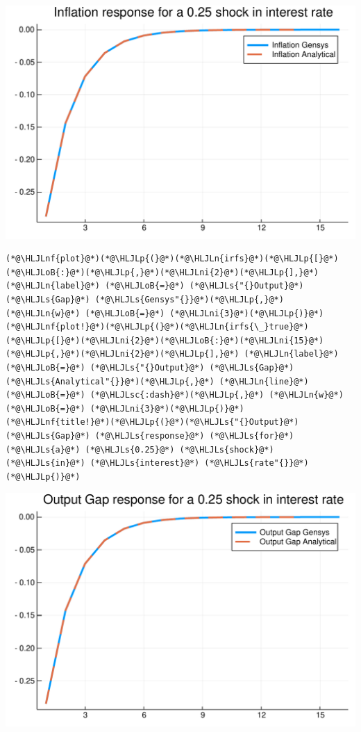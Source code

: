 \documentclass[12pt,a4paper]{article}
\newcommand{\HLJLn}[1]{#1}
\newcommand{\HLJLnf}[1]{\textcolor[RGB]{66,102,213}{#1}}
\newcommand{\HLJLs}[1]{\textcolor[RGB]{201,61,57}{#1}}
\newcommand{\HLJLsc}[1]{\textcolor[RGB]{201,61,57}{#1}}
\newcommand{\HLJLni}[1]{\textcolor[RGB]{59,151,46}{#1}}
\newcommand{\HLJLoB}[1]{\textcolor[RGB]{102,102,102}{\textbf{#1}}}
\newcommand{\HLJLp}[1]{#1}
\begin{document}
\includegraphics[width=\linewidth]{figures/dsge_and_julia_11_1.pdf}

\begin{lstlisting}
(*@\HLJLnf{plot}@*)(*@\HLJLp{(}@*)(*@\HLJLn{irfs}@*)(*@\HLJLp{[}@*)(*@\HLJLoB{:}@*)(*@\HLJLp{,}@*)(*@\HLJLni{2}@*)(*@\HLJLp{],}@*) (*@\HLJLn{label}@*) (*@\HLJLoB{=}@*) (*@\HLJLs{"{}Output}@*) (*@\HLJLs{Gap}@*) (*@\HLJLs{Gensys"{}}@*)(*@\HLJLp{,}@*) (*@\HLJLn{w}@*) (*@\HLJLoB{=}@*) (*@\HLJLni{3}@*)(*@\HLJLp{)}@*)
(*@\HLJLnf{plot!}@*)(*@\HLJLp{(}@*)(*@\HLJLn{irfs{\_}true}@*)(*@\HLJLp{[}@*)(*@\HLJLni{2}@*)(*@\HLJLoB{:}@*)(*@\HLJLni{15}@*)(*@\HLJLp{,}@*)(*@\HLJLni{2}@*)(*@\HLJLp{],}@*) (*@\HLJLn{label}@*) (*@\HLJLoB{=}@*) (*@\HLJLs{"{}Output}@*) (*@\HLJLs{Gap}@*) (*@\HLJLs{Analytical"{}}@*)(*@\HLJLp{,}@*) (*@\HLJLn{line}@*) (*@\HLJLoB{=}@*) (*@\HLJLsc{:dash}@*)(*@\HLJLp{,}@*) (*@\HLJLn{w}@*) (*@\HLJLoB{=}@*) (*@\HLJLni{3}@*)(*@\HLJLp{)}@*)
(*@\HLJLnf{title!}@*)(*@\HLJLp{(}@*)(*@\HLJLs{"{}Output}@*) (*@\HLJLs{Gap}@*) (*@\HLJLs{response}@*) (*@\HLJLs{for}@*) (*@\HLJLs{a}@*) (*@\HLJLs{0.25}@*) (*@\HLJLs{shock}@*) (*@\HLJLs{in}@*) (*@\HLJLs{interest}@*) (*@\HLJLs{rate"{}}@*)(*@\HLJLp{)}@*)
\end{lstlisting}

\includegraphics[width=\linewidth]{figures/dsge_and_julia_12_1.pdf}
\end{document}
